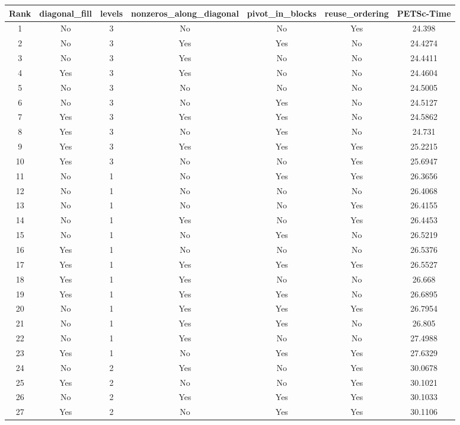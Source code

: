 \begin{table}[h]
  \tiny
  \centering
  \begin{tabular}{ccccccc}
    \hline Rank &  diagonal\_fill & levels & nonzeros\_along\_diagonal & pivot\_in\_blocks & reuse\_ordering  & PETSc-Time\\ \hline
    1 & No & 3 & No & No & Yes & 24.398 \\
    2 & No & 3 & Yes & Yes & No & 24.4274 \\
    3 & No & 3 & Yes & No & No & 24.4411 \\
    4 & Yes & 3 & Yes & No & No & 24.4604 \\
    5 & No & 3 & No & No & No & 24.5005 \\
    6 & No & 3 & No & Yes & No & 24.5127 \\
    7 & Yes & 3 & Yes & Yes & No & 24.5862 \\
    8 & Yes & 3 & No & Yes & No & 24.731 \\
    9 & Yes & 3 & Yes & Yes & Yes & 25.2215 \\
    10 & Yes & 3 & No & No & Yes & 25.6947 \\
    11 & No & 1 & No & Yes & Yes & 26.3656 \\
    12 & No & 1 & No & No & No & 26.4068 \\
    13 & No & 1 & No & No & Yes & 26.4155 \\
    14 & No & 1 & Yes & No & Yes & 26.4453 \\
    15 & No & 1 & No & Yes & No & 26.5219 \\
    16 & Yes & 1 & No & No & No & 26.5376 \\
    17 & Yes & 1 & Yes & Yes & Yes & 26.5527 \\
    18 & Yes & 1 & Yes & No & No & 26.668 \\
    19 & Yes & 1 & Yes & Yes & No & 26.6895 \\
    20 & No & 1 & Yes & Yes & Yes & 26.7954 \\
    21 & No & 1 & Yes & Yes & No & 26.805 \\
    22 & No & 1 & Yes & No & No & 27.4988 \\
    23 & Yes & 1 & No & Yes & Yes & 27.6329 \\
    24 & No & 2 & Yes & No & Yes & 30.0678 \\
    25 & Yes & 2 & No & No & Yes & 30.1021 \\
    26 & No & 2 & Yes & Yes & Yes & 30.1033 \\
    27 & Yes & 2 & No & Yes & Yes & 30.1106 \\

\end{tabular}
\end{table}

